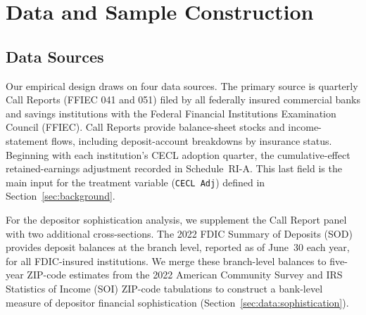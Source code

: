 
\section{Data and Sample Construction}
\label{sec:data}

\subsection{Data Sources}
\label{sec:data:sources}

Our empirical design draws on four data sources. The primary source is quarterly
Call Reports (FFIEC 041 and 051) filed by all federally insured commercial banks
and savings institutions with the Federal Financial Institutions Examination
Council (FFIEC). Call Reports provide balance-sheet stocks and income-statement
flows, including deposit-account breakdowns by insurance status. Beginning with each
institution's CECL adoption quarter, the cumulative-effect retained-earnings
adjustment recorded in Schedule~RI-A. This last field is the main input for the
treatment variable (\texttt{CECL Adj}) defined in Section~\ref{sec:background}.

For the depositor sophistication analysis, we supplement the Call Report panel
with two additional cross-sections. The 2022 FDIC Summary of Deposits (SOD)
provides deposit balances at the branch level, reported as of June~30 each year,
for all FDIC-insured institutions. We merge these branch-level balances to
five-year ZIP-code estimates from the 2022 American Community Survey and IRS
Statistics of Income (SOI) ZIP-code tabulations to construct a
bank-level measure of depositor financial sophistication
(Section~\ref{sec:data:sophistication}).

